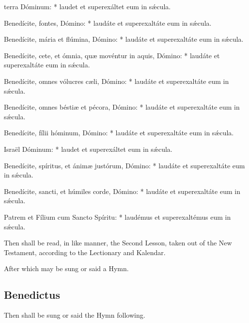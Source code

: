 { terra Dóminum: * laudet et superexáltet eum in sǽcula.\par
{}
Benedícite, fontes, Dómino: * laudáte et superexaltáte eum in sǽcula.\par
Benedícite, mária et flúmina, Dómino: * laudáte et superexaltáte eum in sǽcula.\par
Benedícite, cete, et ómnia, qu{\ae} movéntur in aquis, Dómino: * laudáte et superexaltáte eum in sǽcula.\par
Benedícite, omnes vólucres c{\ae}li, Dómino: * laudáte et superexaltáte eum in sǽcula.\par
Benedícite, omnes bésti{\ae} et pécora, Dómino: * laudáte et superexaltáte eum in sǽcula.\par
Benedícite, fílii hóminum, Dómino: * laudáte et superexaltáte eum in sǽcula.\par
{} Israël Dóminum: * laudet et superexáltet eum in sǽcula.\par
{}
Benedícite, spíritus, et ánim{\ae} justórum, Dómino: * laudáte et superexaltáte eum in sǽcula.\par
Benedícite, sancti, et húmiles corde, Dómino: * laudáte et superexaltáte eum in sǽcula.\par
{} Patrem et Fílium cum Sancto Spíritu: * laudémus et superexaltémus eum in sǽcula.}

\begin{rubric}
    {Then shall be read, in like manner, the Second Lesson, taken out of the New Testament, according to the Lectionary and Kalendar.}
\end{rubric}
\begin{rubric}
	After which may be sung or said a Hymn.
\end{rubric}

\clearpage
\subsection{Benedictus}\label{Benedictus}

\begin{rubric}
     Then shall be sung or said the Hymn following.%
\end{rubric}


